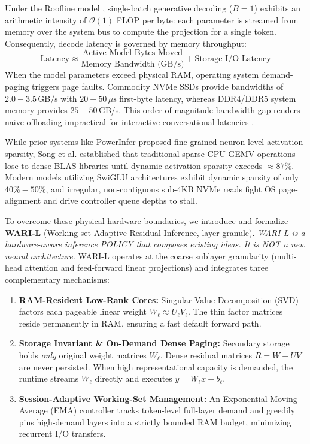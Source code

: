 \documentclass[11pt,a4paper]{article}
\begin{document}
Under the Roofline model \cite{williams2009roofline}, single-batch generative decoding ($B=1$) exhibits an arithmetic intensity of $\mathcal{O}(1)$ FLOP per byte: each parameter is streamed from memory over the system bus to compute the projection for a single token. Consequently, decode latency is governed by memory throughput:
\begin{equation}
    \text{Latency} \approx \frac{\text{Active Model Bytes Moved}}{\text{Memory Bandwidth (GB/s)}} + \text{Storage I/O Latency}
\end{equation}
When the model parameters exceed physical RAM, operating system demand-paging triggers page faults. Commodity NVMe SSDs provide bandwidths of $2.0-3.5$\,GB/s with $20-50\,\mu\text{s}$ first-byte latency, whereas DDR4/DDR5 system memory provides $25-50$\,GB/s. This order-of-magnitude bandwidth gap renders naive offloading impractical for interactive conversational latencies \cite{sheng2023flexgen}.

While prior systems like PowerInfer \cite{song2024powerinfer} proposed fine-grained neuron-level activation sparsity, Song et al. established that traditional sparse CPU GEMV operations lose to dense BLAS libraries until dynamic activation sparsity exceeds $\approx 87\%$. Modern models utilizing SwiGLU architectures exhibit dynamic sparsity of only $40\%-50\%$, and irregular, non-contiguous sub-4KB NVMe reads fight OS page-alignment and drive controller queue depths to stall. 

To overcome these physical hardware boundaries, we introduce and formalize \textbf{WARI-L} (Working-set Adaptive Residual Inference, layer granule). \textit{WARI-L is a hardware-aware inference POLICY that composes existing ideas. It is NOT a new neural architecture.} WARI-L operates at the coarse sublayer granularity (multi-head attention and feed-forward linear projections) and integrates three complementary mechanisms:
\begin{enumerate}
    \item \textbf{RAM-Resident Low-Rank Cores:} Singular Value Decomposition (SVD) factors each pageable linear weight $W_\ell \approx U_\ell V_\ell$. The thin factor matrices reside permanently in RAM, ensuring a fast default forward path.
    \item \textbf{Storage Invariant \& On-Demand Dense Paging:} Secondary storage holds \textit{only} original weight matrices $W_\ell$. Dense residual matrices $R = W - UV$ are never persisted. When high representational capacity is demanded, the runtime streams $W_\ell$ directly and executes $y = W_\ell x + b_\ell$.
    \item \textbf{Session-Adaptive Working-Set Management:} An Exponential Moving Average (EMA) controller tracks token-level full-layer demand and greedily pins high-demand layers into a strictly bounded RAM budget, minimizing recurrent I/O transfers.
\end{enumerate}
\end{document}
